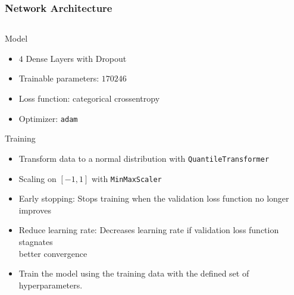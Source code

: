 \documentclass[8pt]{beamer}
\begin{document}
\begin{frame}
\begin{columns}[t]
\begin{column}{0.7\textwidth}
\begin{figure}
            \end{figure}
        \end{column}
    \end{columns}
\end{frame}


\begin{frame}
    \frametitle{Network Architecture}
    \begin{columns}[T]
        \begin{column}{0.7\textwidth}
            \begin{alertblock}{Model}
                \begin{itemize}
                    \item $\num{4}$ Dense Layers with Dropout
                    \item Trainable parameters: $\num{170246}$
                    \item Loss function: categorical crossentropy
                    \item Optimizer: \texttt{adam}
                \end{itemize}
            \end{alertblock}
            \begin{alertblock}{Training}
                \begin{itemize}
                    \item Transform data to a normal distribution with \texttt{QuantileTransformer}
                    \item Scaling on $[-1,1]$ with \texttt{MinMaxScaler}
                    \item Early stopping: Stops training when the validation loss function no longer improves
                    \item Reduce learning rate: Decreases learning rate if validation loss function stagnates \\
                    \to better convergence
                    \item Train the model using the training data with the defined set of hyperparameters.
                \end{itemize}
            \end{alertblock}
        \end{column}
        \begin{column}{0.3\textwidth}
            \begin{tikzpicture}[
                scale=0.8, every node/.style={scale=0.8},
                layer/.style={rectangle,draw=black,fill=blue!30,minimum size=1cm},
                sum/.style={circle,draw=black,fill=yellow!30},
            ]


\end{tikzpicture}
\end{column}
\end{columns}
\end{frame}
\end{document}
